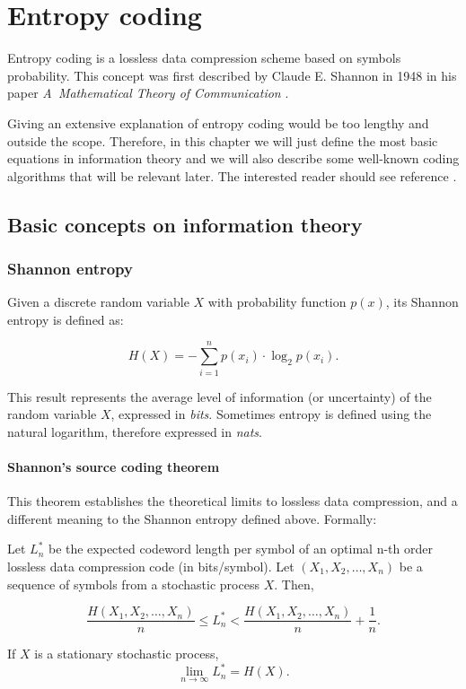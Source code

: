 \chapter{Entropy coding} \label{ch:entropy_coding}
Entropy coding is a lossless data compression scheme based on symbols probability. This concept was first described by Claude E. Shannon in 1948 in his paper \textit{A~Mathematical Theory of Communication} \parencite{Shannon1948}.

Giving an extensive explanation of entropy coding would be too lengthy and outside the scope. Therefore, in this chapter we will just define the most basic equations in information theory and we will also describe some well-known coding algorithms that will be relevant later. The interested reader should see reference \parencite{cover}.

\section{Basic concepts on information theory}
\subsection{Shannon entropy}
Given a discrete random variable $X$ with probability function $p(x)$, its Shannon entropy is defined as:

\begin{equation}
H(X) = - \sum_{i=1}^{n} p(x_i) \cdot \log_2 p(x_i).
\end{equation}

This result represents the average level of information (or uncertainty) of the random variable $X$, expressed in \textit{bits}. Sometimes entropy is defined using the natural logarithm, therefore expressed in \textit{nats}.

\subsubsection{Shannon's source coding theorem}
This theorem establishes the theoretical limits to lossless data compression, and a different meaning to the Shannon entropy defined above. Formally:

\begin{theorem} \label{theo:shannon}
Let $L_n^*$ be the expected codeword length per symbol of an optimal n-th order lossless data compression code (in bits/symbol). Let $(X_1, X_2, \dots, X_n )$ be a sequence of symbols from a stochastic process $X$. Then,

\begin{equation}
	\frac{H(X_1, X_2, \dots, X_n )}{n} \leq L_n^* < \frac{H(X_1, X_2, \dots, X_n )}{n} + \frac{1}{n}.
\end{equation}

If $X$ is a stationary stochastic process,
\begin{equation}
	\lim_{n \to \infty} L_n^* = H(X).
\end{equation}
\end{theorem}

